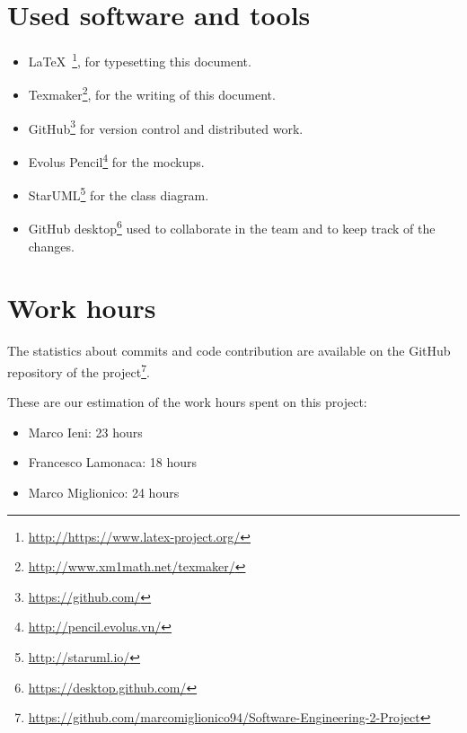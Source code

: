 \section{Used software and tools}
\begin{itemize}
    \item \LaTeX\ \footnote{\url{http://https://www.latex-project.org/}}, for typesetting this document.
    \item Texmaker\footnote{\url{http://www.xm1math.net/texmaker/}}, for the writing of this document.
    \item GitHub\footnote{\url{https://github.com/}} for version control and distributed work.
    \item Evolus Pencil\footnote{\url{http://pencil.evolus.vn/}} for the mockups.
    \item StarUML\footnote{\url{http://staruml.io/}} for the class diagram.
    \item GitHub desktop\footnote{\url{https://desktop.github.com/}} used to collaborate in the team and to keep track of the changes. 
\end{itemize}

\section{Work hours}
The statistics about commits and code contribution are available on the GitHub repository of the project\footnote{\url{https://github.com/marcomiglionico94/Software-Engineering-2-Project}}.

These are our estimation of the work hours spent on this project:
\begin{itemize}
    \item Marco Ieni: 23 hours
    \item Francesco Lamonaca: 18 hours
    \item Marco Miglionico: 24 hours
\end{itemize}

